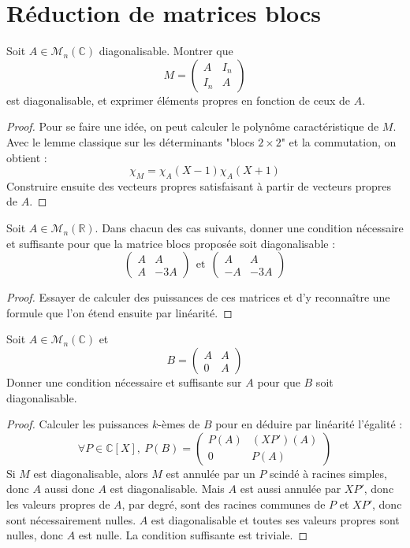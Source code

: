 \documentclass[french,a4paper]{article}
\newcommand{\R}{\mathbb{R}}
\newcommand{\C}{\mathbb{C}}
\theoremstyle{plain}
\theoremstyle{definition}
\theoremstyle{remark}
\begin{document}
\section{Réduction de matrices blocs}

\begin{ex}{}
	Soit $A\in\mathcal{M}_n(\C)$ diagonalisable. Montrer que $$M=\begin{pmatrix}
		A&I_n\\
		I_n&A
	\end{pmatrix}$$ est diagonalisable, et exprimer éléments propres en fonction de ceux de $A$.
\end{ex}
\begin{proof}
	Pour se faire une idée, on peut calculer le polynôme caractéristique de $M$. Avec le lemme classique sur les déterminants "blocs $2\times2$" et la commutation, on obtient : $$\chi_M=\chi_A(X-1)\chi_A(X+1)$$ Construire ensuite des vecteurs propres satisfaisant à partir de vecteurs propres de $A$.
\end{proof}

\begin{ex}{}
	Soit $A\in\mathcal{M}_n(\R)$. Dans chacun des cas suivants, donner une condition nécessaire et suffisante pour que la matrice blocs proposée soit diagonalisable : $$\begin{pmatrix}
		A&A\\
		A&-3A
	\end{pmatrix}\ \ \text{et}\ \ \begin{pmatrix}
	A&A\\
	-A&-3A
	\end{pmatrix}$$
\end{ex}
\begin{proof}
	Essayer de calculer des puissances de ces matrices et d'y reconnaître une formule que l'on étend ensuite par linéarité.
\end{proof}

\begin{ex}{}
	Soit $A\in\mathcal{M}_n(\C)$ et $$B=\begin{pmatrix}
		A&A\\
		0&A
	\end{pmatrix}$$ Donner une condition nécessaire et suffisante sur $A$ pour que $B$ soit diagonalisable.
\end{ex}
\begin{proof}
	Calculer les puissances $k$-èmes de $B$ pour en déduire par linéarité l'égalité : $$\forall P\in\C[X],\ P(B)=\begin{pmatrix}
		P(A)&(XP')(A)\\
		0&P(A)
	\end{pmatrix}$$ Si $M$ est diagonalisable, alors $M$ est annulée par un $P$ scindé à racines simples, donc $A$ aussi donc $A$ est diagonalisable. Mais $A$ est aussi annulée par $XP'$, donc les valeurs propres de $A$, par degré, sont des racines communes de $P$ et $XP'$, donc sont nécessairement nulles. $A$ est diagonalisable et toutes ses valeurs propres sont nulles, donc $A$ est nulle. La condition suffisante est triviale.
\end{proof}
\end{document}
